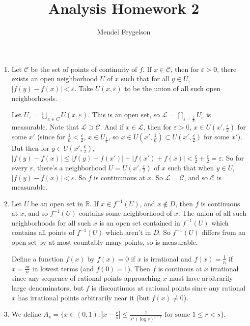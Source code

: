 \documentclass{article}
\title{Analysis Homework 2}
\author{Mendel Feygelson}
\newcommand\RR{\mathbb R}
\newcommand\C{\mathscr C}
\renewcommand\L{\mathscr L}
\begin{document}
\maketitle
\begin{enumerate}

   \item Let $\C$ be the set of points of continuity of $f$. If $x \in \C$, then
      for $\varepsilon>0$, there exists an open neighborhood $U$
      of $x$ such that for all $y \in U$, $|f(y) - f(x)| <
      \varepsilon$. Take $U(x,\varepsilon)$ to be the union of all such open
      neighborhoods.

      Let $U_\varepsilon = \bigcup_{x \in C} U(x,\varepsilon)$. This is an open
      set, so $\L = \bigcap_{\varepsilon=\frac1n} U_\varepsilon$ is measurable.
      Note that $\L \supset \C$. And if $x \in \L$, then for $\varepsilon>0$, $x
      \in U(x',\frac\varepsilon2)$ for some $x'$ (since for $\frac1n <
      \frac\varepsilon2$, $x \in U_{\frac1n}$, so $x \in U(x',\frac1n) \subset
      U(x',\frac\varepsilon2)$ for some $x'$). But then for $y \in
      U(x',\frac\varepsilon2)$, $|f(y) - f(x)| \leq |f(y) - f(x')| + |f(x') +
      f(x)| < \frac\varepsilon2 + \frac\varepsilon2 = \varepsilon$. So for every
      $\varepsilon$, there's a neighborhood $U = U(x',\frac\varepsilon2)$ of $x$
      such that when $y \in U$, $|f(y) - f(x)| < \varepsilon$. So $f$ is
      continunous at $x$. So $\L = \C$, and so $\C$ is measurable.

   \item Let $U$ be an open set in $\RR$. If $x \in f^{-1}(U)$, and $x \not\in
      D$, then $f$ is continuous at $x$, and so $f^{-1}(U)$ contains some
      neighborhood of $x$. The union of all such neighborhoods for all such $x$
      is an open set contained in $f^{-1}(U)$ which contains all points of
      $f^{-1}(U)$ which aren't in $D$. So $f^{-1}(U)$ differs from an open set
      by at most countably many points, so is measurable.

      Define a function $f(x)$ by $f(x) = 0$ if $x$ is irrational and $f(x) =
      \frac1n$ if $x = \frac mn$ in lowest terms (and $f(0) = 1$). Then $f$ is
      continous at $x$ irrational since any sequence of rational points
      approaching $x$ must have arbitrarily large denominators, but $f$ is
      discontinuos at rational points since any rational $x$ has irrational
      points arbitrarily near it (but $f(x) \neq 0$).

   \item We define $A_s = \{ x \in (0,1) : \left| x - \frac rs \right| \leq
         \frac1{s^2(\log s)^{1+\varepsilon}} \textrm{ for some } 1 \leq r < s
      \}$.
      

\end{enumerate}
\end{document}
